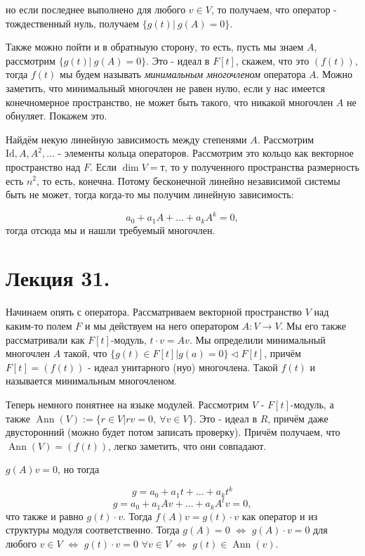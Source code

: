 \documentclass[a4paper,100pt]{article}
\theoremstyle{indented}
\theoremstyle{definition}
\theoremstyle{remark}
\DeclareMathOperator{\Ann}{Ann}
\begin{document}
но если последнее выполнено для любого $v\in V$, то получаем, что оператор - тождественный нуль, получаем $\{g(t)\vert \: g(A) = 0\}$. \ 

Также можно пойти и в обратныую сторону, то есть, пусть мы знаем $A$, рассмотрим $\{g(t)\vert \: g(A)=0\}$. Это - идеал в $F[t]$, скажем, что это $(f(t))$, тогда $f(t)$ мы будем называть \textit{минимальным многочленом} оператора $A$. Можно заметить, что минимальный многочлен не равен нулю, если у нас имеется конечномерное пространство, не может быть такого, что никакой многочлен $A$ не обнуляет. Покажем это. \ 

Найдём некую линейную зависимость между степенями $A$. Рассмотрим $\text{Id}, A, A^2, \ldots$ - элементы кольца операторов. Рассмотрим это кольцо как векторное пространство над $F$. Если $\dim V = т$, то у полученного пространства размерность есть $n^2$, то есть, конечна. Потому бесконечной линейно независимой системы быть не может, тогда когда-то мы получим линейную зависимость:

\[
    a_0+a_1 A+\ldots+a_k A^k=0, 
\]
тогда отсюда мы и нашли требуемый многочлен.

\section{Лекция 31.}

Начинаем опять с оператора. Рассматриваем векторной пространство $V$ над каким-то полем $F$ и мы действуем на него оператором $A:V\rightarrow V$. Мы его также рассматривали как $F[t]$-модуль, $t\cdot v=Av$. Мы определили минимальный многочлен $A$ такой, что $\{g(t)\in F[t]\vert g(a)=0\}\triangleleft F[t]$, причём $F[t]=(f(t))$ - идеал унитарного (нуо) многочлена. Такой $f(t)$ и называется минимальным многочленом. \
    
Теперь немного понятнее на языке модулей. Рассмотрим $V$ - $F[t]$-модуль, а также $\Ann(V):=\{r\in V\vert rv=0, \: \forall v\in V\}$. Это - идеал в $R$, причём даже двусторонний (можно будет потом записать проверку). Причём получаем, что $\Ann(V)=(f(t))$, легко заметить, что они совпадают.\ 

$g(A)v=0$, но тогда 

\[
    g=a_0+a_1t+\ldots+a_kt^k
\]
\[
    g=a_0+a_1Av+\ldots+a_kA^tv=0,
\]
что также и равно $g(t)\cdot v$. Тогда $f(A)v=g(t)\cdot v$ как оператор и из структуры модуля соответственно. Тогда $g(A)=0$ $\Leftrightarrow$ $g(A)\cdot v=0$ для любого $v\in V$ $\Leftrightarrow$ $g(t)\cdot v=0$ $\forall v\in V$ $\Leftrightarrow$ $g(t)\in \Ann (v)$.\ 
\end{document}
